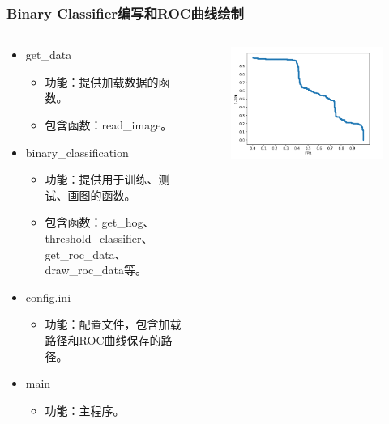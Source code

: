 \documentclass[notheorems, aspectratio=54]{beamer}
\begin{document}
\begin{frame}
\frametitle{Binary Classifier编写和ROC曲线绘制}
\begin{columns}
\begin{column}{.5\linewidth}
\begin{itemize}
	\item get\_data
	\begin{itemize}
		\item 功能：提供加载数据的函数。
		\item 包含函数：read\_image。
	\end{itemize}
	\item binary\_classification
	\begin{itemize}
		\item 功能：提供用于训练、测试、画图的函数。
		\item 包含函数：get\_hog、threshold\_classifier、get\_roc\_data、draw\_roc\_data等。
	\end{itemize}
	\item config.ini
	\begin{itemize}
		\item 功能：配置文件，包含加载路径和ROC曲线保存的路径。
	\end{itemize}
	\item main
	\begin{itemize}
		\item 功能：主程序。
	\end{itemize}
\end{itemize}
\end{column}
\begin{column}{.5\linewidth}
\begin{figure}[htbp]
	\centering
	\includegraphics[width=1.0\textwidth]{rocCurve.png}
\end{figure}
\end{column}
\end{columns}
\end{frame}
\end{document}
